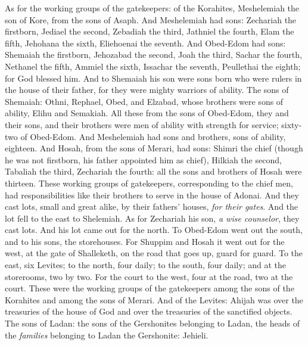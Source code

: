 \begin{biblechapter} %
 As for the working groups of the gatekeepers: of the Korahites, Meshelemiah the son of Kore, from the sons of Asaph.
\verse And Meshelemiah had sons: Zechariah the firstborn, Jediael the second, Zebadiah the third, Jathniel the fourth,
\verse Elam the fifth, Jehohana the sixth, Eliehoenai the seventh.
\verse And Obed-Edom had sons: Shemaiah the firstborn, Jehozabad the second, Joah the third, Sachar the fourth, Nethanel the fifth,
\verse Ammiel the sixth, Issachar the seventh, Peullethai the eighth; for God blessed him.
\verse And to Shemaiah his son were sons born who were rulers in the house of their father, for they were mighty warriors of ability.
\verse The sons of Shemaiah: Othni, Rephael, Obed, and Elzabad, whose brothers were sons of ability, Elihu and Semakiah.
\verse All these from the sons of Obed-Edom, they and their sons, and their brothers were men of ability with strength for service; sixty-two of Obed-Edom.
\verse And Meshelemiah had sons and brothers, sons of ability, eighteen.
\verse And Hosah, from the sons of Merari, had sons: Shimri the chief (though he was not firstborn, his father appointed him as chief),
\verse Hilkiah the second, Tabaliah the third, Zechariah the fourth: all the sons and brothers of Hosah were thirteen.
\verse These working groups of gatekeepers, corresponding to the chief men, had responsibilities like their brothers to serve in the house of Adonai.
\verse And they cast lots, small and great alike, by their fathers’ houses, \textit{for their gates}.
\verse And the lot fell to the east to Shelemiah. As for Zechariah his son, \textit{a wise counselor}, they cast lots. And his lot came out for the north.
\verse To Obed-Edom went out the south, and to his sons, the storehouses.
\verse For Shuppim and Hosah it went out for the west, at the gate of Shalleketh, on the road that goes up, guard for guard.
\verse To the east, six Levites; to the north, four daily; to the south, four daily; and at the storerooms, two by two.
\verse For the court to the west, four at the road, two at the court.
\verse These were the working groups of the gatekeepers among the sons of the Korahites and among the sons of Merari.
 And of the Levites: Ahijah was over the treasuries of the house of God and over the treasuries of the sanctified objects.
\verse The sons of Ladan: the sons of the Gershonites belonging to Ladan, the heads of the \textit{families} belonging to Ladan the Gershonite: Jehieli.

\end{biblechapter}

